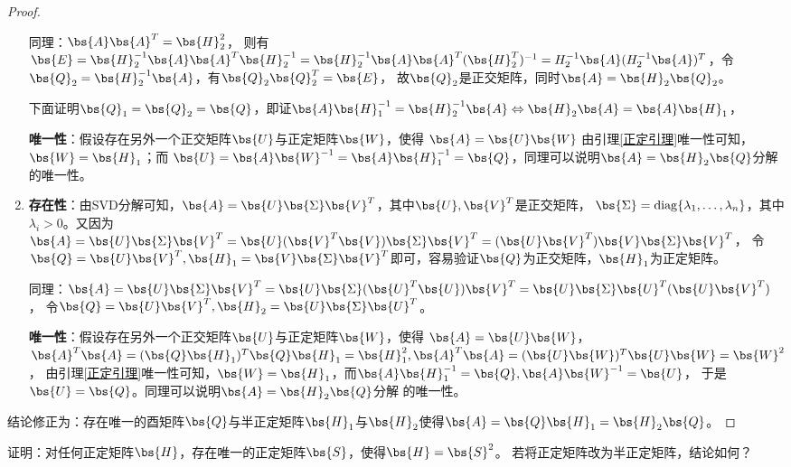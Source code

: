 \documentclass[12pt, a4paper, oneside, UTF8]{ctexbook}
\begin{document}
\begin{proof}
\begin{enumerate}[label=(\arabic*)]
    同理：$\bs{A}\bs{A}^T=\bs{H}_2^2$，
    则有$\bs{E}=\bs{H}_2^{-1}\bs{A}\bs{A}^T\bs{H}_2^{-1}=\bs{H}_2^{-1}\bs{A}\bs{A}^T(\bs{H}_2^T)^{-1}
    =H_2^{-1}\bs{A}(H_2^{-1}\bs{A})^T$，令$\bs{Q}_2=\bs{H}_2^{-1}\bs{A}$，有$\bs{Q}_2\bs{Q}_2^T=\bs{E}$，
    故$\bs{Q}_2$是正交矩阵，同时$\bs{A}=\bs{H}_2\bs{Q}_2$。

    下面证明$\bs{Q}_1=\bs{Q}_2=\bs{Q}$，即证$\bs{A}\bs{H}_1^{-1}=\bs{H}_2^{-1}\bs{A} \Leftrightarrow \bs{H}_2\bs{A}=\bs{A}\bs{H}_1$，


    \textbf{唯一性}：假设存在另外一个正交矩阵$\bs{U}$与正定矩阵$\bs{W}$，使得
    $\bs{A}=\bs{U}\bs{W}$
    由引理\ref{正定引理}唯一性可知，$\bs{W}=\bs{H}_1$；而
    $\bs{U}=\bs{A}\bs{W}^{-1}=\bs{A}\bs{H}_1^{-1}=\bs{Q}$，同理可以说明$\bs{A}=\bs{H}_2\bs{Q}$分解
    的唯一性。
        
    \item
    \textbf{存在性}：由SVD分解可知，$\bs{A}=\bs{U}\bs{\Sigma}\bs{V}^T$，其中$\bs{U},\bs{V}^T$是正交矩阵，
    $\bs{\Sigma}=\mathrm{diag}\{\lambda_1,\ldots,\lambda_n\}$，其中$\lambda_i >0$。又因为
    $\bs{A}=\bs{U}\bs{\Sigma}\bs{V}^T=\bs{U}(\bs{V}^T\bs{V})\bs{\Sigma}\bs{V}^T=(\bs{U}\bs{V}^T)\bs{V}\bs{\Sigma}\bs{V}^T$，
    令$\bs{Q}=\bs{U}\bs{V}^T,\bs{H}_1=\bs{V}\bs{\Sigma}\bs{V}^T$即可，容易验证$\bs{Q}$为正交矩阵，$\bs{H}_1$为正定矩阵。

    同理：$\bs{A}=\bs{U}\bs{\Sigma}\bs{V}^T=\bs{U}\bs{\Sigma}(\bs{U}^T\bs{U})\bs{V}^T=\bs{U}\bs{\Sigma}\bs{U}^T(\bs{U}\bs{V}^T)$，
    令$\bs{Q}=\bs{U}\bs{V}^T,\bs{H}_2=\bs{U}\bs{\Sigma}\bs{U}^T$。
    
    \textbf{唯一性}：假设存在另外一个正交矩阵$\bs{U}$与正定矩阵$\bs{W}$，使得
    $\bs{A}=\bs{U}\bs{W}$，$\bs{A}^T\bs{A}=(\bs{Q}\bs{H}_1)^T\bs{Q}\bs{H}_1=\bs{H}_1^2,
    \bs{A}^T\bs{A}=(\bs{U}\bs{W})^T\bs{U}\bs{W}=\bs{W}^2$，
    由引理\ref{正定引理}唯一性可知，$\bs{W}=\bs{H}_1$，而$\bs{A}\bs{H}_1^{-1}=\bs{Q},\bs{A}\bs{W}^{-1}=\bs{U}$，
    于是$\bs{U}=\bs{Q}$。同理可以说明$\bs{A}=\bs{H}_2\bs{Q}$分解
    的唯一性。
\end{enumerate}
结论修正为：存在唯一的酉矩阵$\bs{Q}$与半正定矩阵$\bs{H}_1$与$\bs{H}_2$使得$\bs{A}=\bs{Q}\bs{H}_1=\bs{H}_2\bs{Q}$。

\end{proof}

   


\begin{question}
    证明：对任何正定矩阵$\bs{H}$，存在唯一的正定矩阵$\bs{S}$，使得$\bs{H}=\bs{S}^2$。
    若将正定矩阵改为半正定矩阵，结论如何？
\end{question}
\end{document}
